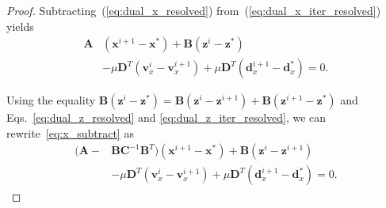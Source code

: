 \documentclass[10pt,twocolumn,twoside]{IEEEtran}
\newcommand{\x}{\mathbf{x}} %
\newcommand{\z}{\mathbf{z}} %
\newcommand{\vs}{\mathbf{v}} %
\newcommand{\dv}{\mathbf{d}} %
\newcommand{\D}{\mathbf{D}} %
\newcommand{\A}{\mathbf{A}} %
\newcommand{\B}{\mathbf{B}} %
\newcommand{\C}{\mathbf{C}} %
\begin{document}
\begin{proof}
	Subtracting~(\ref{eq:dual_x_resolved}) from~(\ref{eq:dual_x_iter_resolved}) yields
	\begin{equation} \label{eq:x_subtract}
	\begin{aligned}
	\A &(\x^{i+1} - \x^*) + \B (\z^i - \z^* ) \\
	& - \mu \D^T (\vs_x^i - \vs_x^{i+1}) + \mu \D^T (\dv_x^{i+1} - \dv_x^*)= 0.
	\end{aligned}
	\end{equation}
	
	Using the equality $\B (\z^i - \z^*) = \B (\z^i - \z^{i+1}) + \B (\z^{i+1} - \z^*)$ and Eqs.~\eqref{eq:dual_z_resolved} and \eqref{eq:dual_z_iter_resolved}, we can rewrite~\eqref{eq:x_subtract} as 
	\begin{equation} \label{eq:x_subtract2}
	\begin{aligned}
	( \A - &\B \C^{-1} \B^T ) (\x^{i+1} - \x^*) + \B (\z^i - \z^{i+1}) \\
	& - \mu \D^T (\vs_x^i - \vs_x^{i+1}) + \mu \D^T (\dv_x^{i+1} - \dv_x^*)= 0.
	\end{aligned}
	\end{equation} 
	

\end{proof}
\end{document}
